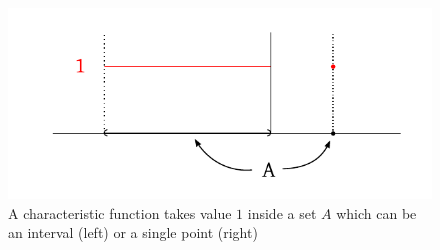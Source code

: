 \documentclass{article}
\begin{document}
\begin{figure}[t]
  \begin{center}
    \includegraphics{img/13_characteristic_function.pdf}
    \caption{A characteristic function takes value $1$ inside a set $A$ which can be an interval (left) or a single point (right)}
    \label{img:charf}
  \end{center}
\end{figure}
\end{document}

